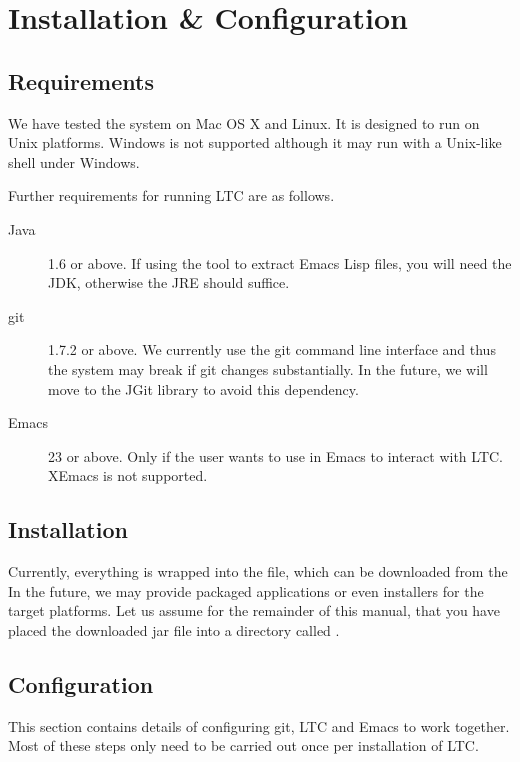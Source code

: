 \chapter{Installation \& Configuration} \label{ch:install}

\section{Requirements}

We have tested the system on Mac OS X and Linux. It is designed to run on Unix platforms. Windows is not supported although it may run with a Unix-like shell under Windows.

Further requirements for running LTC are as follows.
\begin{description}
\item[Java] 1.6 or above.  If using the  tool to extract Emacs Lisp files, you will need the JDK, otherwise the JRE should suffice.
\item[git] 1.7.2 or above.  We currently use the git command line interface and thus the system may break if git changes substantially.  In the future, we will move to the JGit library to avoid this dependency.
\item[Emacs] 23 or above.  Only if the user wants to use  in Emacs to interact with LTC.  XEmacs is not supported.
\end{description}

\section{Installation}

Currently, everything is wrapped into the  file, which can be downloaded from the   In the future, we may provide packaged applications or even installers for the target platforms.  Let us assume for the remainder of this manual, that you have placed the downloaded jar file into a directory called . 

\section{Configuration}

This section contains details of configuring git, LTC and Emacs to work together.  Most of these steps only need to be carried out once per installation of LTC.

